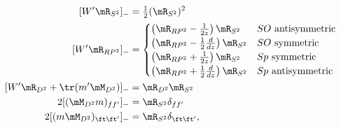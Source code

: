 \begin{equation}
 \begin{split}
 [W'\mR_{S^2}]_- &= \tfrac{1}{2}(\mR_{S^2}{})^2
 \\
 [W'\mR_{RP^2}]_-
 &=
 \begin{cases}
  \left(\mR_{RP^2}-\frac{1}{2z}\right)\mR_{S^2}           & \text{$SO$ antisymmetric} \\
  \left(\mR_{RP^2}-\frac{1}{2}\frac{d}{dz}\right)\mR_{S^2}& \text{$SO$ symmetric} \\
  \left(\mR_{RP^2}+\frac{1}{2z}\right)\mR_{S^2}           & \text{$Sp$ symmetric} \\
  \left(\mR_{RP^2}+\frac{1}{2}\frac{d}{dz}\right)\mR_{S^2}& \text{$Sp$ antisymmetric}
 \end{cases}
  \\
  [W'\mR_{D^2}+\tr(m'\mM_{D^2})]_-  &= \mR_{D^2} \mR_{S^2}
  \\
  2[(\mM_{D^2} m)_{ff'}]_-     &= \mR_{S^2} \delta_{ff'}
  \\
  2[(m \mM_{D^2})_{\ft\ft'}]_- &= \mR_{S^2} \delta_{\ft \ft'} ,
\end{split}
\label{eq:loop_eq_mm}
\end{equation}

